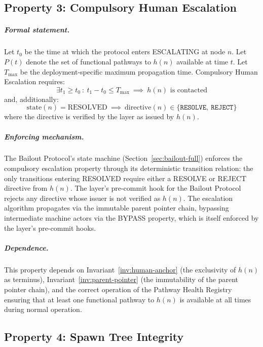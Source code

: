 \subsection{Property 3: Compulsory Human Escalation}\label{sec:compulsory-escalation}


\subparagraph{Formal statement.}  Let $t_0$ be the time at which the protocol
enters ESCALATING at node $n$.  Let $P(t)$ denote the set of functional
pathways to $h(n)$ available at time $t$.  Let $T_{\max}$ be the deployment-specific
maximum propagation time.  Compulsory Human Escalation requires:
\[
\exists t_1 \geq t_0\ :\ t_1 - t_0 \leq T_{\max}
\ \implies\ h(n) \text{ is contacted}
\]
and, additionally:
\[
\text{state}(n) = \text{RESOLVED}
\ \implies\ \text{directive}(n) \in \{\texttt{RESOLVE},\ \texttt{REJECT}\}
\]
where the directive is verified by the \fact{} layer as issued by $h(n)$.

\subparagraph{Enforcing mechanism.}  The Bailout Protocol's state machine
(Section~\ref{sec:bailout-full}) enforces the compulsory escalation property
through its deterministic transition relation: the only transitions entering
RESOLVED require either a RESOLVE or REJECT directive from $h(n)$.  The
\fact{} layer's pre-commit hook for the Bailout Protocol rejects any directive
whose issuer is not verified as $h(n)$.  The escalation algorithm propagates
via the immutable parent pointer chain, bypassing intermediate machine actors
via the BYPASS property, which is itself enforced by the \fact{} layer's
pre-commit hooks.

\subparagraph{Dependence.}  This property depends on Invariant~\ref{inv:human-anchor}
(the exclusivity of $h(n)$ as terminus), Invariant~\ref{inv:parent-pointer} (the
immutability of the parent pointer chain), and the correct operation of the
Pathway Health Registry ensuring that at least one functional pathway to $h(n)$
is available at all times during normal operation.

\subsection{Property 4: Spawn Tree Integrity}\label{sec:spawn-tree-integrity}

